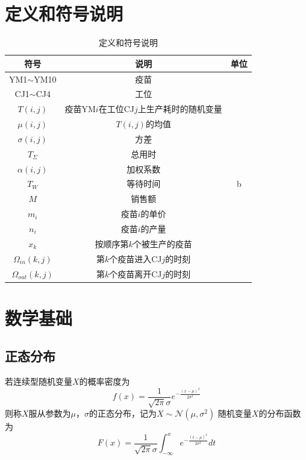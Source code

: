 \documentclass[UTF8]{ctexart}
\begin{document}
	\section{定义和符号说明}
	\begin{table}[H]
	\centering
	\begin{tabular}{ c c c}
		\toprule[2pt]
		符号 & 说明  & 单位 \\
		\hline
		YM1$\sim$YM10 & 疫苗 & \\
		CJ1$\sim$CJ4 &  工位 &\\
		$T(i,j)$&  疫苗YM$i$在工位CJ$j$上生产耗时的随机变量&\\
		$\mu(i,j)$& $T(i,j)$的均值 &\\
		$\sigma(i,j)$ & 方差 &\\
		$T_{\Sigma}$ & 总用时 &\\
		$\alpha(i,j)$ & 加权系数 &\\
		$T_{W}$ & 等待时间 & b\\
		$M$ & 销售额 & \\
		$m_{i}$ & 疫苗$i$的单价 & \\
		$n_{i}$ & 疫苗$i$的产量 & \\
		$x_{k}$& 按顺序第$k$个被生产的疫苗& \\
		$\Omega_{in}(k,j)$& 第$k$个疫苗进入CJ$j$的时刻 & \\
		$\Omega_{out}(k,j)$& 第$k$个疫苗离开CJ$j$的时刻 & \\
		
		\bottomrule[2pt]
	\end{tabular}\caption{定义和符号说明}
\end{table}
	
	\section{数学基础}
	\subsection{正态分布}
	若连续型随机变量$X$的概率密度为
	\begin{equation}
	f(x)=\frac{1}{\sqrt{2\pi}\sigma}e^{-\frac{(x-\mu)^2}{2\sigma^2}}
	\end{equation}
	则称$X$服从参数为$\mu$，$\sigma$的正态分布，记为$X\sim\mathcal{N}(\mu,\sigma^2)$
	随机变量$X$的分布函数为
	\begin{equation}
	F(x)=\frac{1}{\sqrt{2\pi}\sigma}\int^{x}_{-\infty}e^{-\frac{(t-\mu)^2}{2\sigma^2}}dt
	\end{equation}
\end{document}
